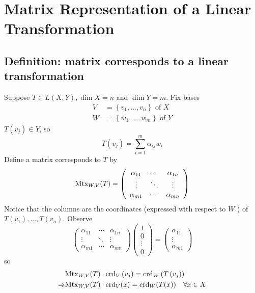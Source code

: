 \documentclass[11pt]{elegantbook}
\begin{document}
\section{Matrix Representation of a Linear Transformation}

\subsection{Definition: matrix corresponds to a linear transformation}
Suppose $T \in L(X, Y), \operatorname{dim} X=n$ and $\operatorname{dim} Y=m$. Fix bases
$$
\begin{aligned}
V & =\left\{v_1, \ldots, v_n\right\} \text { of } X \\
W & =\left\{w_1, \ldots, w_m\right\} \text { of } Y
\end{aligned}
$$
$T\left(v_j\right) \in Y$, so
$$
T\left(v_j\right)=\sum_{i=1}^m \alpha_{i j} w_i
$$
Define a matrix corresponds to $T$ by
$$
\textnormal{Mtx}_{W, V}(T)=\left(\begin{array}{ccc}
\alpha_{11} & \cdots & \alpha_{1 n} \\
\vdots & \ddots & \vdots \\
\alpha_{m 1} & \cdots & \alpha_{m n}
\end{array}\right)
$$
Notice that the columns are the coordinates (expressed with respect to $W$ ) of $T\left(v_1\right), \ldots, T\left(v_n\right)$.
Observe
$$
\left(\begin{array}{ccc}
\alpha_{11} & \cdots & \alpha_{1 n} \\
\vdots & \ddots & \vdots \\
\alpha_{m 1} & \cdots & \alpha_{m n}
\end{array}\right)\left(\begin{array}{c}
1 \\
0 \\
\vdots \\
0
\end{array}\right)=\left(\begin{array}{c}
\alpha_{11} \\
\vdots \\
\alpha_{m 1}
\end{array}\right)
$$
so
$$
\begin{aligned}
    &\textnormal{Mtx}_{W, V}(T) \cdot \textnormal{crd}_V\left(v_j\right)  =\textnormal{crd}_W\left(T\left(v_j\right)\right) \\
    \Rightarrow &\textnormal{Mtx}_{W, V}(T) \cdot \textnormal{crd}_V(x)  =\textnormal{crd}_W(T(x)) \quad \forall x \in X
\end{aligned}
$$
\end{document}
